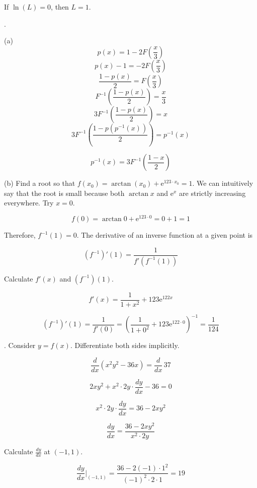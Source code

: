 \documentclass{article}
\begin{document}
\hfill

\noindent If $\ln(L)=0$, then $\boxed{L=1}$.

\newpage

.

\hfill

\noindent (a) \[p(x)=1-2F\left(\frac x3\right)\]
\[p(x)-1=-2F\left(\frac x3\right)\]
\[\frac{1-p(x)}{2}=F\left(\frac x3\right)\]
\[F^{-1}\left(\frac{1-p(x)}{2}\right)=\frac x3\]
\[3F^{-1}\left(\frac{1-p(x)}{2}\right)=x\]
\[3F^{-1}\left(\frac{1-p\left(p^{-1}(x)\right)}{2}\right)=p^{-1}(x)\]

\[\boxed{p^{-1}(x)=3F^{-1}\left(\frac{1-x}{2}\right)}\]

\hfill

\noindent (b) Find a root so that $f(x_0) = \arctan(x_0)+\mathrm{e}^{123\cdot x_0} = 1$. We can intuitively say that the root is small because both $\arctan x$ and $\mathrm{e}^x$ are strictly increasing everywhere. Try $x=0$.

\[f(0)=\arctan 0+\mathrm{e}^{123\cdot 0}=0+1=1\]

\hfill

\noindent Therefore, $f^{-1}(1)=0$. The derivative of an inverse function at a given point is

\[\left(f^{-1}\right)'(1)=\frac1{f'(f^{-1}(1))}\]

\hfill

\noindent Calculate $f'(x)$ and $(f^{-1})(1)$.

\[f'(x)=\frac1{1+x^2}+123\mathrm{e}^{122x}\]

\[\left(f^{-1}\right)'(1)=\frac{1}{f'(0)}=\left( \frac1{1+0^2}+123\mathrm{e}^{122\cdot0} \right)^{-1}=\boxed{\frac1{124}}\]

\hfill

. Consider $y=f(x)$. Differentiate both sides implicitly.

\[\frac{d}{dx}\left(x^2y^2-36x\right) = \frac{d}{dx}\,37\]

\[2xy^2+ x^2\cdot2y\cdot \frac{dy}{dx}-36 = 0\]

\[x^2\cdot2y\cdot \frac{dy}{dx}=36 - 2xy^2\]

\[\frac{dy}{dx}=\frac{36-2xy^2}{x^2\cdot2y}\]

\hfill

\noindent Calculate $\displaystyle \frac{dy}{dx}$ at $(-1,1)$.

\hfill

\begin{equation}\frac{dy}{dx}\Bigg|_{(-1,1)}=\frac{36-2(-1)\cdot1^2}{(-1)^2\cdot2\cdot1} = 19\end{equation}
\end{document}
